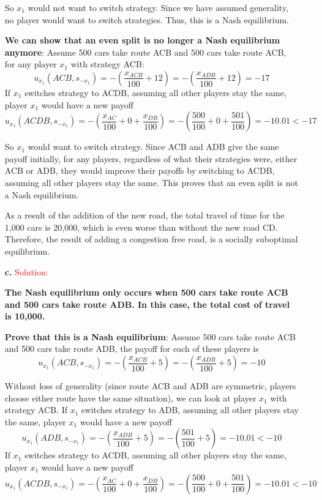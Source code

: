 \documentclass[11pt]{article} %
\begin{document}
\begin{itemize}
So $x_1$ would not want to switch strategy. Since we have assumed generality, no player would want to switch strategies. Thus, this is a Nash equilibrium.

\textbf{We can show that an even split is no longer a Nash equilibrium anymore}: Assume 500 cars take route ACB and 500 cars take route ACB, for any player $x_1$ with strategy ACB:
$$u_{x_1}(ACB, s_{-x_1})=-(\frac{x_{ACB}}{100}+12)=-(\frac{x_{ADB}}{100}+12) = -17$$
If $x_1$ switches strategy to ACDB, assuming all other players stay the same, player $x_1$ would have a new payoff
$$ u_{x_1}(ACDB, s_{-x_1})=-(\frac{x_{AC}}{100}+0+\frac{x_{DB}}{100}) =-(\frac{500}{100}+0+\frac{501}{100}) = -10.01 < -17$$

So $x_1$ would want to switch strategy. Since ACB and ADB give the same payoff initially, for any players, regardless of what their strategies were, either ACB or ADB, they would improve their payoffs by switching to ACDB, assuming all other players stay the same. This proves that an even split is not a Nash equilibrium. 

As a result of the addition of the new road, the total travel of time for the 1,000 cars is 20,000, which is even worse than without the new road CD. Therefore, the result of adding a congestion free road, is a socially suboptimal equilibrium. 


\item[\textbf{c. }] 
\textcolor{red}{Solution:}
 
\textbf{The Nash equilibrium only occurs when 500 cars take route ACB and 500 cars take route ADB. In this case, the total cost of travel is 10,000.}

\textbf{Prove that this is a Nash equilibrium}: Assume 500 cars take route ACB and 500 cars take route ADB, the payoff for each of these players is
$$u_{x_1}(ACB, s_{-x_1})=-(\frac{x_{ACB}}{100}+5)=-(\frac{x_{ADB}}{100}+5) = -10$$

Without loss of generality (since route ACB and ADB are symmetric, players choose either route have the same situation), we can look at player $x_1$ with strategy ACB. If $x_1$ switches strategy to ADB, assuming all other players stay the same, player $x_1$ would have a new payoff
$$ u_{x_1}(ADB, s_{-x_1})=-(\frac{x_{ADB}}{100}+5) =-(\frac{501}{100}+5) = -10.01 < -10$$
 If $x_1$ switches strategy to ACDB, assuming all other players stay the same, player $x_1$ would have a new payoff
$$ u_{x_1}(ACDB, s_{-x_1})=-(\frac{x_{AC}}{100}+0+\frac{x_{DB}}{100}) =-(\frac{500}{100}+0+\frac{501}{100}) = -10.01 < -10$$


\end{itemize}
\end{document}
